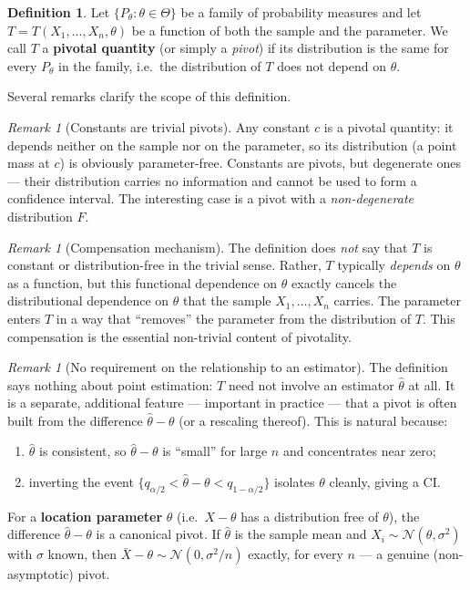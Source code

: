 \documentclass[a4paper,oneside,12pt]{extarticle}
\theoremstyle{plain}
\theoremstyle{definition}
\newtheorem{definition}[proposition]{Definition}
\theoremstyle{remark}
\newtheorem{remark}[proposition]{Remark}
\begin{document}
\begin{definition}
Let $\{P_\theta : \theta \in \Theta\}$ be a family of probability
measures and let $T = T(X_1,\ldots,X_n,\theta)$ be a function of
both the sample and the parameter.  We call $T$ a
\textbf{pivotal quantity} (or simply a \emph{pivot}) if its
distribution is the same for every $P_\theta$ in the family, i.e.\
the distribution of $T$ does not depend on $\theta$.
\end{definition}

Several remarks clarify the scope of this definition.

\begin{remark}[Constants are trivial pivots]
Any constant $c$ is a pivotal quantity: it depends neither on the
sample nor on the parameter, so its distribution (a point mass at
$c$) is obviously parameter-free.  Constants are pivots, but
degenerate ones --- their distribution carries no information and
cannot be used to form a confidence interval.  The interesting case
is a pivot with a \emph{non-degenerate} distribution $F$.
\end{remark}

\begin{remark}[Compensation mechanism]
The definition does \emph{not} say that $T$ is constant or
distribution-free in the trivial sense.  Rather, $T$ typically
\emph{depends} on $\theta$ as a function, but this functional
dependence on $\theta$ exactly cancels the distributional dependence
on $\theta$ that the sample $X_1,\ldots,X_n$ carries.  The parameter
enters $T$ in a way that ``removes'' the parameter from the
distribution of $T$.  This compensation is the essential non-trivial
content of pivotality.
\end{remark}

\begin{remark}[No requirement on the relationship to an estimator]
The definition says nothing about point estimation: $T$ need not
involve an estimator $\hat\theta$ at all.  It is a separate,
additional feature --- important in practice --- that a pivot is
often built from the difference $\hat\theta - \theta$ (or a
rescaling thereof).  This is natural because:
\begin{enumerate}[label=(\roman*)]
  \item $\hat\theta$ is consistent, so $\hat\theta - \theta$ is
    ``small'' for large $n$ and concentrates near zero;
  \item inverting the event $\{q_{\alpha/2} < \hat\theta - \theta <
    q_{1-\alpha/2}\}$ isolates $\theta$ cleanly, giving a CI.
\end{enumerate}
For a \textbf{location parameter} $\theta$ (i.e.\ $X - \theta$ has
a distribution free of $\theta$), the difference $\hat\theta - \theta$
is a canonical pivot.  If $\hat\theta$ is the sample mean and $X_i
\sim \mathcal{N}(\theta,\sigma^2)$ with $\sigma$ known, then
$\bar X - \theta \sim \mathcal{N}(0,\sigma^2/n)$ exactly, for every
$n$ --- a genuine (non-asymptotic) pivot.
\end{remark}
\end{document}
